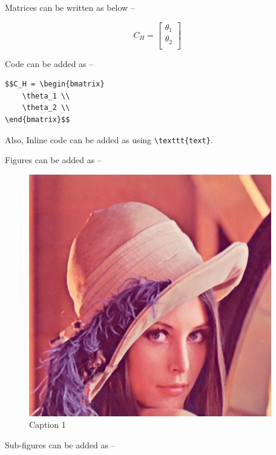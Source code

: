 \documentclass[11pt]{article}
\begin{document}
Matrices can be written as below --

$$C_H = \begin{bmatrix}
	\theta_1 \\ 
	\theta_2 \\
\end{bmatrix}$$

Code can be added as --

\begin{verbatim}
$$C_H = \begin{bmatrix}
	\theta_1 \\ 
	\theta_2 \\
\end{bmatrix}$$
\end{verbatim}

Also, Inline code can be added as using \texttt{\textbackslash texttt\{text\}}.

\pagebreak

Figures can be added as --

\begin{figure}[H]
	\centering
	\includegraphics[scale=1]{figures/lena.png}
    \caption{Caption 1}
    \label{label1}
\end{figure}%

Sub-figures can be added as --
\end{document}
